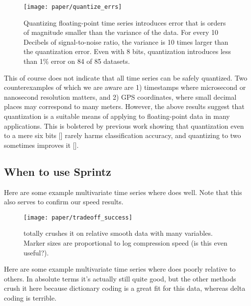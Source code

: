 \begin{figure}[h]
\begin{center}
    \texttt{[image: paper/quantize\_errs]}
    \caption{Quantizing floating-point time series introduces error that is orders of magnitude smaller than the variance of the data. For every 10 Decibels of signal-to-noise ratio, the variance is 10 times larger than the quantization error. Even with 8 bits, quantization introduces less than 1\% error on 84 of 85 datasets.}
    \label{fig:quantize_errs}
\end{center}
\end{figure}

This of course does not indicate that all time series can be safely quantized. Two counterexamples of which we are aware are 1) timestamps where microsecond or nanosecond resolution matters, and 2) GPS coordinates, where small decimal places may correspond to many meters. However, the above results suggest that quantization is a suitable means of applying \minesp to floating-point data in many applications. This is bolstered by previous work showing that quantization even to a mere six bits [] rarely harms classification accuracy, and quantizing to two sometimes improves it [].

\subsection{When to use Sprintz}

Here are some example multivariate time series where \minesp does well. Note that this also serves to confirm our speed results.

\begin{figure}[h]
\begin{center}
    \texttt{[image: paper/tradeoff\_success]}
    \caption{\minesp totally crushes it on relative smooth data with many variables. Marker sizes are proportional to log compression speed (is this even useful?).}
    \label{fig:tradeoff_success}
\end{center}
\end{figure}

Here are some example multivariate time series where \minesp does poorly relative to others. In absolute terms it's actually still quite good, but the other methods crush it here because dictionary coding is a great fit for this data, whereas delta coding is terrible.

